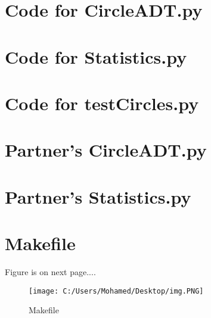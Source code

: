 \documentclass[12pt]{article}
\begin{document}
\lstset{language=Python, basicstyle=\tiny,breaklines=true,showspaces=false,showstringspaces=false,breakatwhitespace=true}

\def\thesection{\Alph{section}} 

\section{Code for CircleADT.py} \label{CircleSect}

\noindent 

\newpage



\section{Code for Statistics.py}

\noindent 


\newpage

\section{Code for testCircles.py} \label{testSect}

\noindent 


\newpage

\section{Partner's CircleADT.py} \label{PartSec}

\noindent 


\newpage

\section{Partner's Statistics.py} \label{PartSec1}

\noindent 
    
\newpage


\section{Makefile} \label{MakefileSect}
Figure is on next page....

\begin{figure}[b]


\centering

\texttt{[image: C:/Users/Mohamed/Desktop/img.PNG]}

\caption{Makefile}

\label{Figure : example}

\end{figure}
\end{document}
